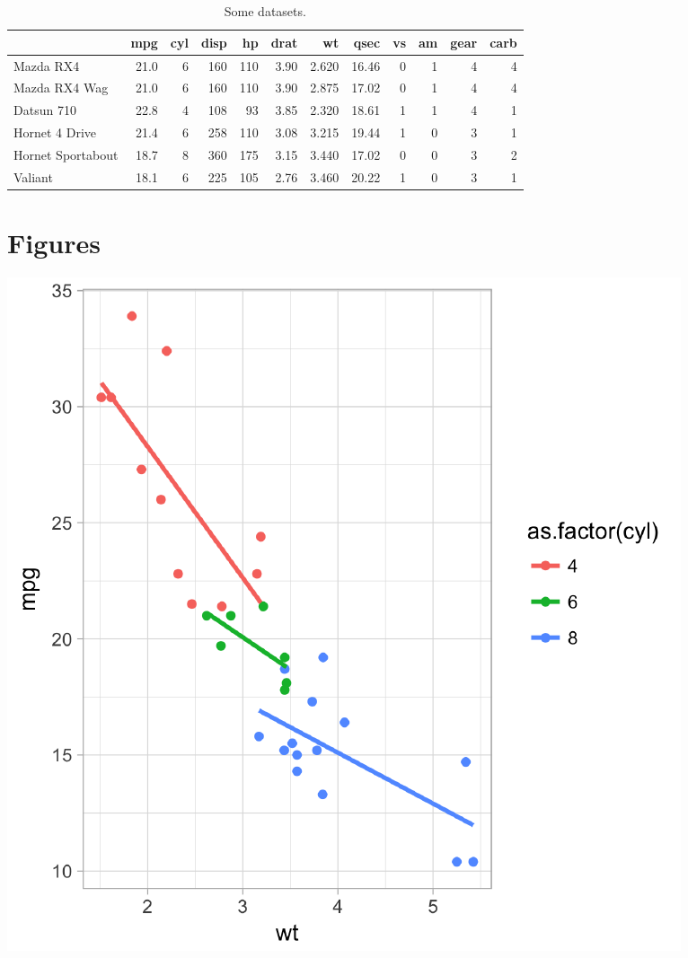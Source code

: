 \documentclass[12pt,]{article}
\begin{document}
\newpage

\hypertarget{section-1}{%
\section{}\label{section-1}}

\begin{table}

\caption{\label{tab:tblm2}Some datasets.}
\centering
\begin{tabular}[t]{l|r|r|r|r|r|r|r|r|r|r|r}
\hline
  & mpg & cyl & disp & hp & drat & wt & qsec & vs & am & gear & carb\\
\hline
Mazda RX4 & 21.0 & 6 & 160 & 110 & 3.90 & 2.620 & 16.46 & 0 & 1 & 4 & 4\\
\hline
Mazda RX4 Wag & 21.0 & 6 & 160 & 110 & 3.90 & 2.875 & 17.02 & 0 & 1 & 4 & 4\\
\hline
Datsun 710 & 22.8 & 4 & 108 & 93 & 3.85 & 2.320 & 18.61 & 1 & 1 & 4 & 1\\
\hline
Hornet 4 Drive & 21.4 & 6 & 258 & 110 & 3.08 & 3.215 & 19.44 & 1 & 0 & 3 & 1\\
\hline
Hornet Sportabout & 18.7 & 8 & 360 & 175 & 3.15 & 3.440 & 17.02 & 0 & 0 & 3 & 2\\
\hline
Valiant & 18.1 & 6 & 225 & 105 & 2.76 & 3.460 & 20.22 & 1 & 0 & 3 & 1\\
\hline
\end{tabular}
\end{table}

\newpage

\hypertarget{figures}{%
\section{Figures}\label{figures}}

\includegraphics{main_text_files/figure-latex/scatplt-1.pdf}
\end{document}
